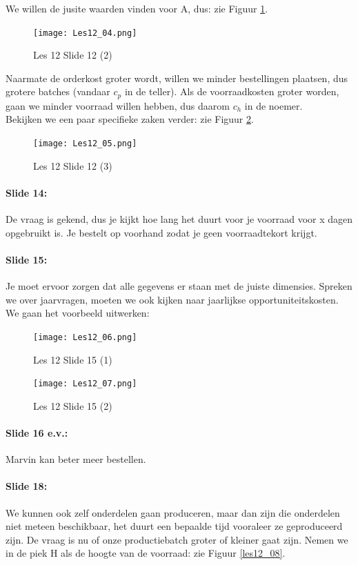 \documentclass[10pt,a4paper]{report}
\begin{document}
We willen de jusite waarden vinden voor A, dus: zie Figuur \ref{les12_04}.\\

\begin{figure}[h!]
\centering
\texttt{[image: Les12\_04.png]}
\caption{Les 12 Slide 12 (2)} 
\label{les12_04}
\end{figure}

Naarmate de orderkost groter wordt, willen we minder bestellingen plaatsen, dus grotere batches (vandaar $c_{p}$ in de teller). Als de voorraadkosten groter worden, gaan we minder voorraad willen hebben, dus daarom $c_{h}$ in de noemer.\\
Bekijken we een paar specifieke zaken verder: zie Figuur \ref{les12_05}.

\begin{figure}[h!]
\centering
\texttt{[image: Les12\_05.png]}
\caption{Les 12 Slide 12 (3)} 
\label{les12_05}
\end{figure}

\paragraph{Slide 14:} De vraag is gekend, dus je kijkt hoe lang het duurt voor je voorraad voor x dagen opgebruikt is. Je bestelt op voorhand zodat je geen voorraadtekort krijgt.

\paragraph{Slide 15:} Je moet ervoor zorgen dat alle gegevens er staan met de juiste dimensies. Spreken we over jaarvragen, moeten we ook kijken naar jaarlijkse opportuniteitskosten. We gaan het voorbeeld uitwerken:

\begin{figure}[h!]
\centering
\texttt{[image: Les12\_06.png]}
\caption{Les 12 Slide 15 (1)} 
\label{les12_06}
\end{figure}

\begin{figure}[h!]
\centering
\texttt{[image: Les12\_07.png]}
\caption{Les 12 Slide 15 (2)} 
\label{les12_07}
\end{figure}

\paragraph{Slide 16 e.v.:} Marvin kan beter meer bestellen.

\paragraph{Slide 18:} We kunnen ook zelf onderdelen gaan produceren, maar dan zijn die onderdelen niet meteen beschikbaar, het duurt een bepaalde tijd vooraleer ze geproduceerd zijn. De vraag is nu of onze productiebatch groter of kleiner gaat zijn. Nemen we in de piek H als de hoogte van de voorraad: zie Figuur \ref{les12_08}. \\
\end{document}
